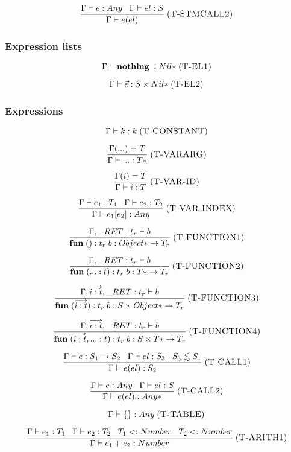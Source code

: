 \documentclass[12pt]{article}
\newcommand{\mylabel}[1]{\; (\textsc{#1})}
\newcommand{\subtype}{<:}
\newcommand{\kw}[1]{\mathbf{#1} \;}
\newcommand{\env}{\Gamma}
\newcommand{\ret}{\string_RET}
\begin{document}
\[
\frac{\env \vdash e:Any \;\;\;
      \env \vdash el:S}
     {\env \vdash e(el)}
\mylabel{T-STMCALL2}
\]

\subsubsection{Expression lists}

\[
\env \vdash \kw{nothing}:{Nil*}
\mylabel{T-EL1}
\]

\[
\env \vdash \vec{e}:S \times {Nil*}
\mylabel{T-EL2}
\]

\subsubsection{Expressions}

\[
\env \vdash k : k
\mylabel{T-CONSTANT}
\]

\[
\frac{\env({...}) = T}
     {\env \vdash {...} : {T*}}
\mylabel{T-VARARG}
\]

\[
\frac{\env(i) = T}
     {\env \vdash i : T}
\mylabel{T-VAR-ID}
\]

\[
\frac{\env \vdash e_{1}:T_{1} \;\;\;
      \env \vdash e_{2}:T_{2}}
     {\env \vdash e_{1}[e_{2}] : Any}
\mylabel{T-VAR-INDEX}
\]

\[
\frac{\env, \ret:t_{r} \vdash b}
     {\kw{fun} ():t_{r} \; b : {Object*} \rightarrow T_{r}}
\mylabel{T-FUNCTION1}
\]

\[
\frac{\env, \ret:t_{r} \vdash b}
     {\kw{fun} ({...}:t):t_{r} \; b : {T*} \rightarrow T_{r}}
\mylabel{T-FUNCTION2}
\]

\[
\frac{\env, \overrightarrow{i:t}, \ret:t_{r} \vdash b}
     {\kw{fun} (\overrightarrow{i:t}):t_{r} \; b :
      S \times {Object*} \rightarrow T_{r}}
\mylabel{T-FUNCTION3}
\]

\[
\frac{\env, \overrightarrow{i:t}, \ret:t_{r} \vdash b}
     {\kw{fun} (\overrightarrow{i:t}, {...}:t):t_{r} \; b :
      S \times {T*} \rightarrow T_{r}}
\mylabel{T-FUNCTION4}
\]

\[
\frac{\env \vdash e:S_{1} \rightarrow S_{2} \;\;\;
      \env \vdash el:S_{3} \;\;\;
      S_{3} \lesssim S_{1}}
     {\env \vdash e(el) : S_{2}}
\mylabel{T-CALL1}
\]

\[
\frac{\env \vdash e:Any \;\;\;
      \env \vdash el:S}
     {\env \vdash e(el) : {Any*}}
\mylabel{T-CALL2}
\]

\[
\env \vdash \{\} : Any
\mylabel{T-TABLE}
\]

\[
\frac{\env \vdash e_{1}:T_{1} \;\;\;
      \env \vdash e_{2}:T_{2} \;\;\;
      T_{1} \subtype Number \;\;\;
      T_{2} \subtype Number}
     {\env \vdash e_{1} + e_{2} : Number}
\mylabel{T-ARITH1}
\]
\end{document}

